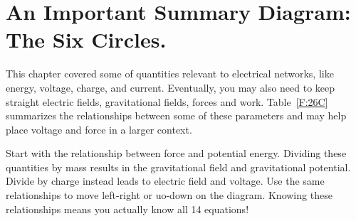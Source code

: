 \section{An Important Summary Diagram: The Six Circles.}
This chapter covered some of quantities relevant to electrical networks, like energy, voltage, charge, and current. Eventually, you may also need to keep straight electric fields, gravitational fields, forces and work. Table~\ref{F:26C} summarizes the relationships between some of these parameters and may help place voltage and force in a larger context.
\par
Start with the relationship between force and potential energy. Dividing these quantities by mass results in the gravitational field and gravitational potential. Divide by charge instead leads to electric field and voltage. Use the same relationships to move left-right or uo-down on the diagram. Knowing these relationships means you actually know all 14 equations!
\par
